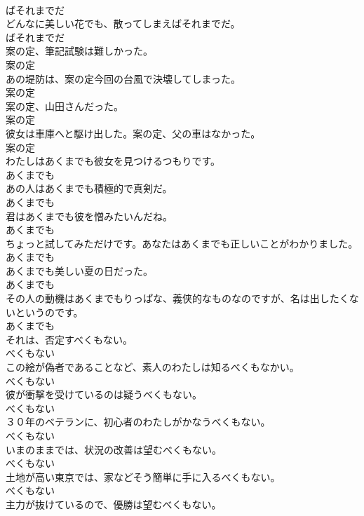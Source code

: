 \documentclass[8pt]{extreport}
\begin{document}
\begin{CJK}{UTF8}{min}
\\	ばそれまでだ	
\\	どんなに美しい花でも、散ってしまえばそれまでだ。	
\\	ばそれまでだ	
\\	案の定、筆記試験は難しかった。	
\\	案の定	
\\	あの堤防は、案の定今回の台風で決壊してしまった。	
\\	案の定	
\\	案の定、山田さんだった。	
\\	案の定	
\\	彼女は車庫へと駆け出した。案の定、父の車はなかった。	
\\	案の定	
\\	わたしはあくまでも彼女を見つけるつもりです。	
\\	あくまでも	
\\	あの人はあくまでも積極的で真剣だ。	
\\	あくまでも	
\\	君はあくまでも彼を憎みたいんだね。	
\\	あくまでも	
\\	ちょっと試してみただけです。あなたはあくまでも正しいことがわかりました。	
\\	あくまでも	
\\	あくまでも美しい夏の日だった。	
\\	あくまでも	
\\	その人の動機はあくまでもりっぱな、義侠的なものなのですが、名は出したくないというのです。	
\\	あくまでも	
\\	それは、否定すべくもない。	
\\	べくもない	
\\	この絵が偽者であることなど、素人のわたしは知るべくもなかい。	
\\	べくもない	
\\	彼が衝撃を受けているのは疑うべくもない。	
\\	べくもない	
\\	３０年のベテランに、初心者のわたしがかなうべくもない。	
\\	べくもない	
\\	いまのままでは、状況の改善は望むべくもない。	
\\	べくもない	
\\	土地が高い東京では、家などそう簡単に手に入るべくもない。	
\\	べくもない	
\\	主力が抜けているので、優勝は望むべくもない。	

\end{CJK}
\end{document}
